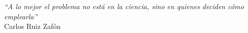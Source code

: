 


\begin{epigrafe}

\vspace*{\fill}
\begin{flushright}
    \textit{``A lo mejor el problema no está en la ciencia, sino en quienes deciden cómo emplearla''} \\ Carlos Ruiz Zafón
\end{flushright}

\end{epigrafe}


